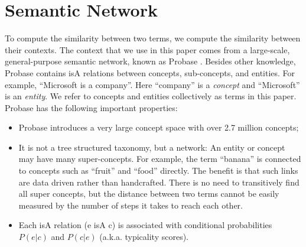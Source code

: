 \section{Semantic Network}
\label{sec:knowledge}

To compute the similarity between two terms, we compute the similarity
between their contexts. The context that we use in this paper comes from a
large-scale, general-purpose semantic network, known as Probase
\cite{12MSRA:Probase}. Besides other knowledge, Probase contains isA
relations between concepts, sub-concepts, and entities.  For example,
``Microsoft is a company''. Here ``company'' is a {\em concept} and
``Microsoft'' is an {\em
  entity}. %
We refer to concepts and entities collectively as terms in this
paper. %
  Probase has the following important properties:
\begin{itemize}
\item Probase introduces a very large concept space with over 2.7
  million concepts;
\item It is not a tree structured taxonomy, but a network: An entity
  or concept may have many super-concepts. For example, the term
  ``banana'' is connected to concepts such as ``fruit'' and ``food''
  directly. The benefit is that such links are data driven rather than
  handcrafted. There is no need to transitively find all super
  concepts, but the distance between two terms cannot be easily
  measured by the number of steps it takes to reach each other.
\item Each isA relation (e isA c) is associated with conditional
  probabilities $P(e|c)$ and $P(c|e)$ (a.k.a.  typicality scores).
\end{itemize}


